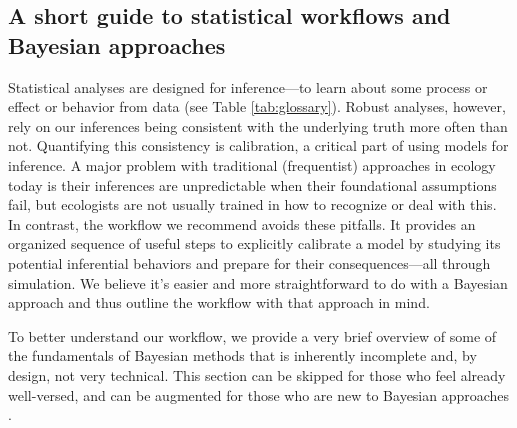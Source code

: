 \documentclass[11pt]{article}
\begin{document}
{\subsection*{A short guide to statistical workflows and Bayesian approaches}
Statistical analyses are designed for inference---to learn about some process or effect or behavior from data  (see Table \ref{tab:glossary}). Robust analyses, however, rely on our inferences being consistent with the underlying truth more often than not.  Quantifying this consistency is calibration, a critical part of using models for inference. A major problem with traditional (frequentist) approaches in ecology today is their inferences are unpredictable when their foundational assumptions fail, but ecologists are not usually trained in how to recognize or deal with this.
In contrast, the workflow we recommend avoids these pitfalls. It provides an organized sequence of useful steps to explicitly calibrate a model by studying its potential inferential behaviors and prepare for their consequences---all through simulation. We believe it's easier and more straightforward to do with a Bayesian approach and thus outline the workflow with that approach in mind. %

To better understand our workflow, we provide a very brief overview of some of the fundamentals of Bayesian methods that is inherently incomplete and, by design, not very technical. This section can be skipped for those who feel already well-versed, and can be augmented for those who are new to Bayesian approaches \citep[for example,][]{statrethink,BDA,regotherstories}.

}
\end{document}
